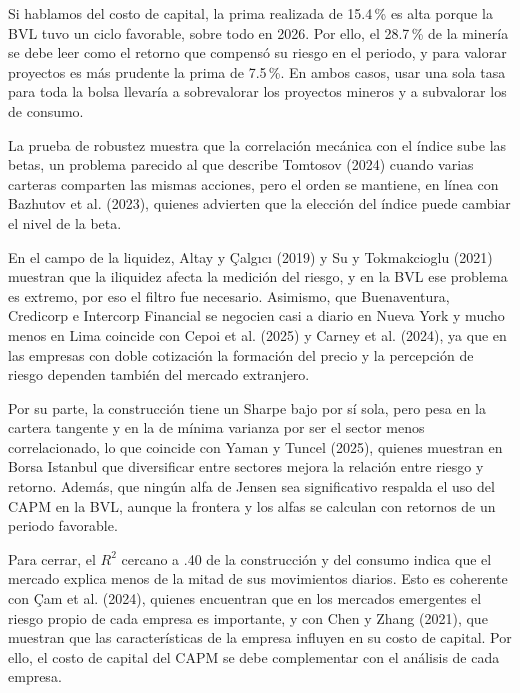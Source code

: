 \documentclass[jrfm,article,submit,oneauthor]{Definitions/mdpi}
\begin{document}
Si hablamos del costo de capital, la prima realizada de 15.4\,\% es alta porque la BVL tuvo un ciclo favorable, sobre todo en 2026. Por ello, el 28.7\,\% de la minería se debe leer como el retorno que compensó su riesgo en el periodo, y para valorar proyectos es más prudente la prima de 7.5\,\%. En ambos casos, usar una sola tasa para toda la bolsa llevaría a sobrevalorar los proyectos mineros y a subvalorar los de consumo.

La prueba de robustez muestra que la correlación mecánica con el índice sube las betas, un problema parecido al que describe Tomtosov (2024) cuando varias carteras comparten las mismas acciones, pero el orden se mantiene, en línea con Bazhutov et al. (2023), quienes advierten que la elección del índice puede cambiar el nivel de la beta.

En el campo de la liquidez, Altay y Çalgıcı (2019) y Su y Tokmakcioglu (2021) muestran que la iliquidez afecta la medición del riesgo, y en la BVL ese problema es extremo, por eso el filtro fue necesario. Asimismo, que Buenaventura, Credicorp e Intercorp Financial se negocien casi a diario en Nueva York y mucho menos en Lima coincide con Cepoi et al. (2025) y Carney et al. (2024), ya que en las empresas con doble cotización la formación del precio y la percepción de riesgo dependen también del mercado extranjero.

Por su parte, la construcción tiene un Sharpe bajo por sí sola, pero pesa en la cartera tangente y en la de mínima varianza por ser el sector menos correlacionado, lo que coincide con Yaman y Tuncel (2025), quienes muestran en Borsa Istanbul que diversificar entre sectores mejora la relación entre riesgo y retorno. Además, que ningún alfa de Jensen sea significativo respalda el uso del CAPM en la BVL, aunque la frontera y los alfas se calculan con retornos de un periodo favorable.

Para cerrar, el $R^2$ cercano a .40 de la construcción y del consumo indica que el mercado explica menos de la mitad de sus movimientos diarios. Esto es coherente con Çam et al. (2024), quienes encuentran que en los mercados emergentes el riesgo propio de cada empresa es importante, y con Chen y Zhang (2021), que muestran que las características de la empresa influyen en su costo de capital. Por ello, el costo de capital del CAPM se debe complementar con el análisis de cada empresa.
\end{document}
